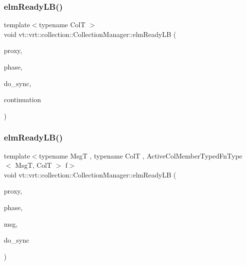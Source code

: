 \subsubsection{\texorpdfstring{elm\+Ready\+L\+B()}{elmReadyLB()}\hspace{0.1cm}{\footnotesize\ttfamily [1/2]}}
{\footnotesize\ttfamily template$<$typename ColT $>$ \\
void vt\+::vrt\+::collection\+::\+Collection\+Manager\+::elm\+Ready\+LB (\begin{DoxyParamCaption}\item[{\hyperlink{namespacevt_1_1vrt_a620a5c8c59d13e513f690c74b4af516f}{Virtual\+Elm\+Proxy\+Type}$<$ ColT $>$ const \&}]{proxy,  }\item[{\hyperlink{namespacevt_a46ce6733d5cdbd735d561b7b4029f6d7}{Phase\+Type}}]{phase,  }\item[{bool}]{do\+\_\+sync,  }\item[{\hyperlink{structvt_1_1vrt_1_1collection_1_1_collection_manager_a2649daab7b437e1e2bdb5f2eefff29b6}{Action\+Finished\+L\+B\+Type}}]{continuation }\end{DoxyParamCaption})}

\mbox{\label{structvt_1_1vrt_1_1collection_1_1_collection_manager_ae074993a281f67e9d661481d9aee886e}} 
\subsubsection{\texorpdfstring{elm\+Ready\+L\+B()}{elmReadyLB()}\hspace{0.1cm}{\footnotesize\ttfamily [2/2]}}
{\footnotesize\ttfamily template$<$typename MsgT , typename ColT , Active\+Col\+Member\+Typed\+Fn\+Type$<$ Msg\+T, Col\+T $>$ f$>$ \\
void vt\+::vrt\+::collection\+::\+Collection\+Manager\+::elm\+Ready\+LB (\begin{DoxyParamCaption}\item[{\hyperlink{namespacevt_1_1vrt_a620a5c8c59d13e513f690c74b4af516f}{Virtual\+Elm\+Proxy\+Type}$<$ ColT $>$ const \&}]{proxy,  }\item[{\hyperlink{namespacevt_a46ce6733d5cdbd735d561b7b4029f6d7}{Phase\+Type}}]{phase,  }\item[{MsgT $\ast$}]{msg,  }\item[{bool}]{do\+\_\+sync }\end{DoxyParamCaption})}

